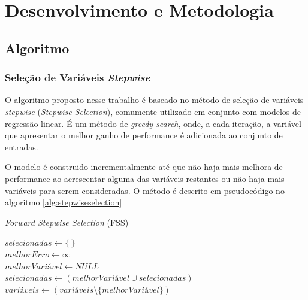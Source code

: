 \chapter[Desenvolvimento e Metodologia]{Desenvolvimento e Metodologia}

\section{Algoritmo}

\subsection{Seleção de Variáveis \textit{Stepwise}}

O algoritmo proposto nesse trabalho é baseado no método de seleção de variáveis \textit{stepwise} 
(\textit{Stepwise Selection}), comumente utilizado em conjunto com modelos de regressão linear. É um método de
\textit{greedy search}, onde, a cada iteração, a variável que apresentar o melhor ganho de performance é 
adicionada ao conjunto de entradas. 

O modelo é construido incrementalmente até que não haja mais melhora de performance ao acrescentar alguma das 
variáveis restantes ou não haja mais variáveis para serem consideradas. O método é descrito em pseudocódigo no 
algoritmo \ref{alg:stepwiseselection}
\\


\begin{algorithm}[H]
    \caption{\textit{Forward Stepwise Selection} (FSS)}
    $selecionadas \gets \{\ \}$ \\
    $melhorErro \gets \infty$ \\
    {   
        $melhorVariável \gets NULL$ \\     
        $selecionadas \gets (melhorVariável \cup selecionadas)$ \\
        $variáveis \gets (variáveis \setminus \{melhorVariável\})$ \\
    }
    \label{alg:stepwiseselection}
\end{algorithm}

